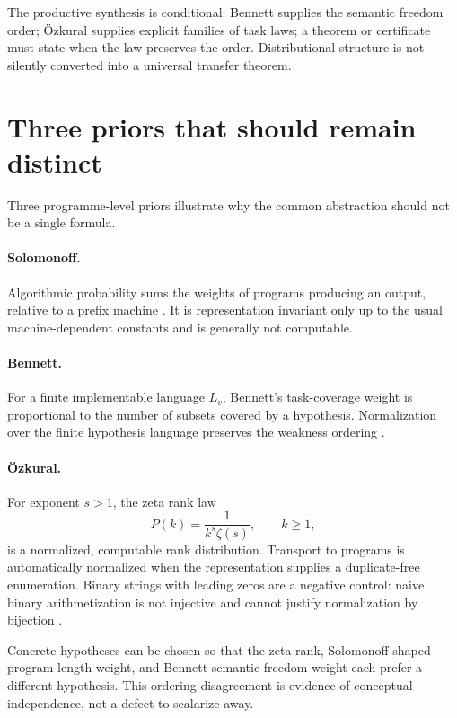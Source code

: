 \documentclass[11pt]{article}
\theoremstyle{remark}
\begin{document}
The productive synthesis is conditional: Bennett supplies the semantic
freedom order; \"Ozkural supplies explicit families of task laws; a theorem or
certificate must state when the law preserves the order.  Distributional
structure is not silently converted into a universal transfer theorem.

\section{Three priors that should remain distinct}

Three programme-level priors illustrate why the common abstraction should not
be a single formula.

\paragraph{Solomonoff.}
Algorithmic probability sums the weights of programs producing an output,
relative to a prefix machine \cite{solomonoff1964}.  It is representation
invariant only up to the usual machine-dependent constants and is generally
not computable.

\paragraph{Bennett.}
For a finite implementable language $L_v$, Bennett's task-coverage weight is
proportional to the number of subsets covered by a hypothesis.  Normalization
over the finite hypothesis language preserves the weakness ordering
\cite{bennett2023}.

\paragraph{\"Ozkural.}
For exponent $s>1$, the zeta rank law
\[
  P(k)=\frac{1}{k^s\zeta(s)},\qquad k\ge1,
\]
is a normalized, computable rank distribution.  Transport to programs is
automatically normalized when the representation supplies a duplicate-free
enumeration.  Binary strings with leading zeros are a negative control: naive
binary arithmetization is not injective and cannot justify normalization by
bijection \cite{ozkuralzeta}.

Concrete hypotheses can be chosen so that the zeta rank, Solomonoff-shaped
program-length weight, and Bennett semantic-freedom weight each prefer a
different hypothesis.  This ordering disagreement is evidence of conceptual
independence, not a defect to scalarize away.
\end{document}
